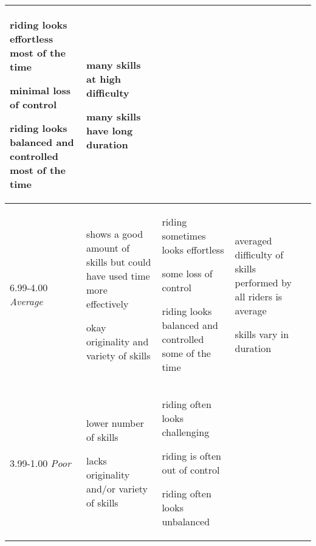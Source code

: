 \begin{minipage}{\textwidth}
\begin{longtable}{|p{1.5cm}|p{5cm}|p{5cm}|p{5cm}|p{1.5cm}|}
\begin{judging_items}%
\item riding looks effortless most of the time
\item minimal loss of control
\item riding looks balanced and controlled most of the time
\end{judging_items} &

\begin{judging_items}%
\item many skills at high difficulty
\item many skills have long duration
\end{judging_items} \\
\hline

6.99-4.00 \newline
\emph{Average} &

\begin{judging_items}%
\item shows a good amount of skills but could have used time more effectively
\item okay originality and variety of skills
\end{judging_items} &

\begin{judging_items}%
\item riding sometimes looks effortless
\item some loss of control
\item riding looks balanced and controlled some of the time
\end{judging_items} &

\begin{judging_items}%
\item averaged difficulty of skills performed by all riders is average
\item skills vary in duration
\end{judging_items} \\
\hline

3.99-1.00 \newline
\emph{Poor} &

\begin{judging_items}%
\item lower number of skills
\item lacks originality and/or variety of skills
\end{judging_items} &

\begin{judging_items}%
\item riding often looks challenging
\item riding is often out of control
\item riding often looks unbalanced
\end{judging_items} &


\end{longtable}
\end{minipage}

